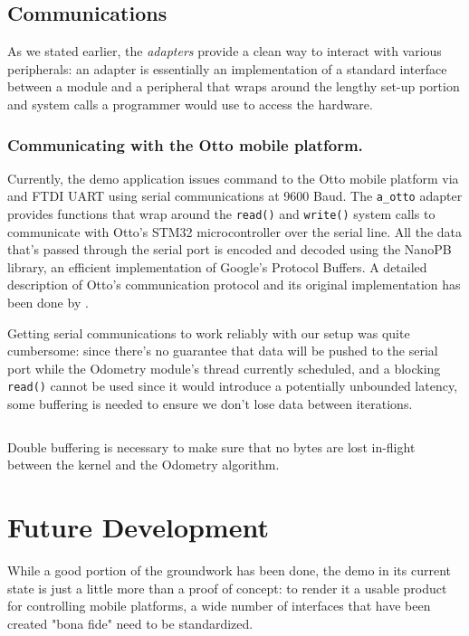 \documentclass[a4paper,12pt]{report}
\begin{document}

\subsection{Communications}

As we stated earlier, the \textit{adapters} provide a clean way to interact with various peripherals: an adapter is essentially an implementation of a standard interface between a module and a peripheral that wraps around the lengthy set-up portion and system calls a programmer would use to access the hardware.

\subsubsection{Communicating with the Otto mobile platform.}

Currently, the demo application issues command to the Otto mobile platform via and FTDI UART using serial communications at 9600 Baud. The \texttt{a\_otto} adapter provides functions that wrap around the \texttt{read()} and \texttt{write()} system calls to communicate with Otto's STM32 microcontroller over the serial line. All the data that's passed through the serial port is encoded and decoded using the NanoPB library, an efficient implementation of Google's Protocol Buffers. A detailed description of Otto's communication protocol and its original implementation has been done by \textcite{fdila-bs-otto}.

Getting serial communications to work reliably with our setup was quite cumbersome: since there's no guarantee that data will be pushed to the serial port while the Odometry module's thread currently scheduled, and a blocking \texttt{read()} cannot be used since it would introduce a potentially unbounded latency, some buffering is needed to ensure we don't lose data between iterations.

\begin{listing}[H]
\inputminted[frame=single,framesep=10pt]{c}{snippets/otto-buffering.c}
\caption{Double buffering is necessary to make sure that no bytes are lost in-flight between the kernel and the Odometry algorithm.}
\end{listing}

\section{Future Development}

While a good portion of the groundwork has been done, the demo in its current state is just a little more than a proof of concept: to render it a usable product for controlling mobile platforms, a wide number of interfaces that have been created "bona fide" need to be standardized.
\end{document}
